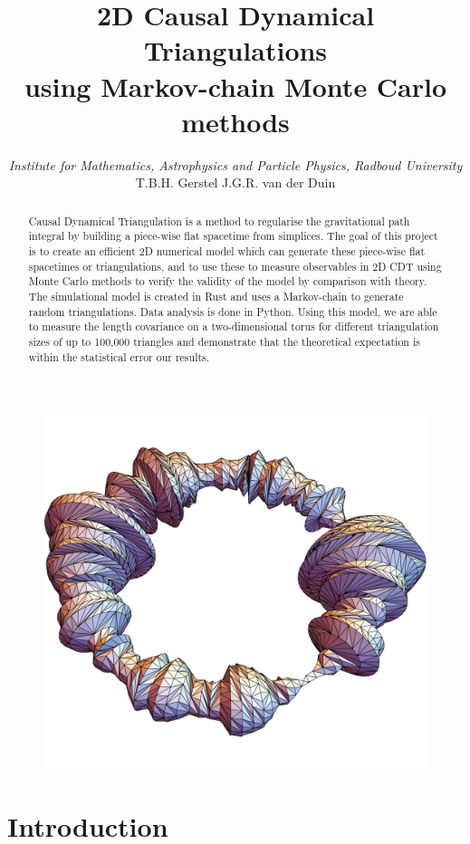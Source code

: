 \documentclass{article}
\title{{\huge 2D Causal Dynamical Triangulations} \\ {\Large using Markov-chain Monte Carlo methods}}
\author{\textit{Institute for Mathematics, Astrophysics and Particle Physics, Radboud University} \\[1mm] T.B.H. Gerstel \hspace{1cm} J.G.R. van der Duin}
\begin{document}
\maketitle

\begin{figure}[h]
    \centering
    \includegraphics[width=0.7\linewidth]{img/torus_triangulation.pdf}
\end{figure}

\begin{abstract} %
    Causal Dynamical Triangulation is a method to regularise the gravitational path integral by building a piece-wise flat spacetime from simplices.
    The goal of this project is to create an efficient 2D numerical model which can generate these piece-wise flat spacetimes or triangulations, and to use these to measure observables in 2D CDT using Monte Carlo methods to verify the validity of the model by comparison with theory.
    The simulational model is created in Rust and uses a Markov-chain to generate random triangulations. Data analysis is done in Python.
    Using this model, we are able to measure the length covariance on a two-dimensional torus for different triangulation sizes of up to 100,000 triangles and demonstrate that the theoretical expectation is within the statistical error our results.
\end{abstract}

\newpage

\section{Introduction}

\end{document}
